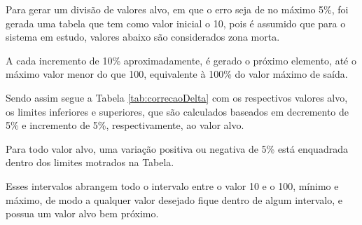 Para gerar um divisão de valores alvo, 
em que o erro seja de no máximo 5\%, 
foi gerada uma tabela que tem como valor inicial
o 10, pois é assumido que para o sistema em estudo,
valores abaixo são considerados zona morta.

A cada incremento de 10\% aproximadamente, 
é gerado o próximo elemento, até o máximo valor menor do que
100, equivalente à 100\% do valor máximo de saída.

Sendo assim segue a 
Tabela \ref{tab:correcaoDelta} 
com os respectivos valores alvo, 
os limites inferiores e superiores, 
que são calculados baseados em decremento de 5\% e
incremento de 5\%, respectivamente, ao valor alvo.

Para todo valor alvo, uma variação positiva ou negativa
de 5\% está enquadrada dentro dos limites motrados na Tabela.

Esses intervalos abrangem todo o intervalo entre 
o valor 10 e o 100, mínimo e máximo, 
de modo a qualquer valor desejado fique 
dentro de algum intervalo, 
e possua um valor alvo bem próximo.


